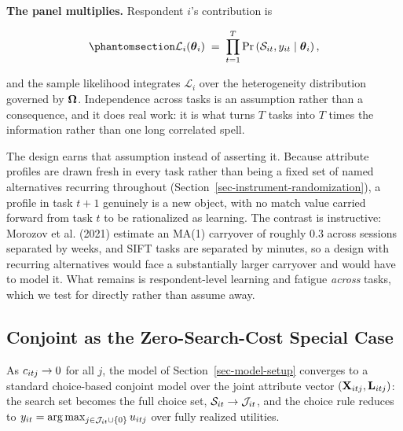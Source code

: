 \documentclass[
  letterpaper,
  DIV=11,
  numbers=noendperiod]{scrartcl}
\begin{document}
\textbf{The panel multiplies.} Respondent \(i\)'s contribution is

\begin{equation}\protect\phantomsection\label{eq-resp-likelihood}{
\mathcal{L}_i(\bftheta_i) \;=\; \prod_{t=1}^{T} \Pr\left(\Sset_{it}, y_{it} \mid \bftheta_i\right),
}\end{equation}

and the sample likelihood integrates \(\mathcal{L}_i\) over the
heterogeneity distribution governed by \(\boldsymbol{\Omega}\). Independence across
tasks is an assumption rather than a consequence, and it does real work:
it is what turns \(T\) tasks into \(T\) times the information rather
than one long correlated spell.

The design earns that assumption instead of asserting it. Because
attribute profiles are drawn fresh in every task rather than being a
fixed set of named alternatives recurring throughout
(Section~\ref{sec-instrument-randomization}), a profile in task \(t+1\)
genuinely is a new object, with no match value carried forward from task
\(t\) to be rationalized as learning. The contrast is instructive:
Morozov et al. (2021) estimate an MA(1) carryover of roughly \(0.3\)
across sessions separated by weeks, and SIFT tasks are separated by
minutes, so a design with recurring alternatives would face a
substantially larger carryover and would have to model it. What remains
is respondent-level learning and fatigue \emph{across} tasks, which we
test for directly rather than assume away.

\subsection{Conjoint as the Zero-Search-Cost Special
Case}\label{sec-model-nesting}

\begin{tcolorbox}[enhanced jigsaw, arc=.35mm, bottomrule=.15mm, bottomtitle=1mm, breakable, colback=white, colbacktitle=quarto-callout-note-color!10!white, colframe=quarto-callout-note-color-frame, coltitle=black, left=2mm, leftrule=.75mm, opacityback=0, opacitybacktitle=0.6, rightrule=.15mm, title=\textcolor{quarto-callout-note-color}{\faInfo}\hspace{0.5em}{Proposition 1}, titlerule=0mm, toprule=.15mm, toptitle=1mm]

As \(c_{itj} \to 0\) for all \(j\), the model of
Section~\ref{sec-model-setup} converges to a standard choice-based
conjoint model over the joint attribute vector
\((\mathbf{X}_{itj}, \mathbf{L}_{itj})\): the search set becomes the full choice
set, \(\mathcal{S}_{it} \to \mathcal{J}_{it}\), and the choice rule reduces to
\(y_{it} = \arg\max_{j \in \mathcal{J}_{it} \cup \{0\}} u_{itj}\) over fully
realized utilities.

\end{tcolorbox}
\end{document}
